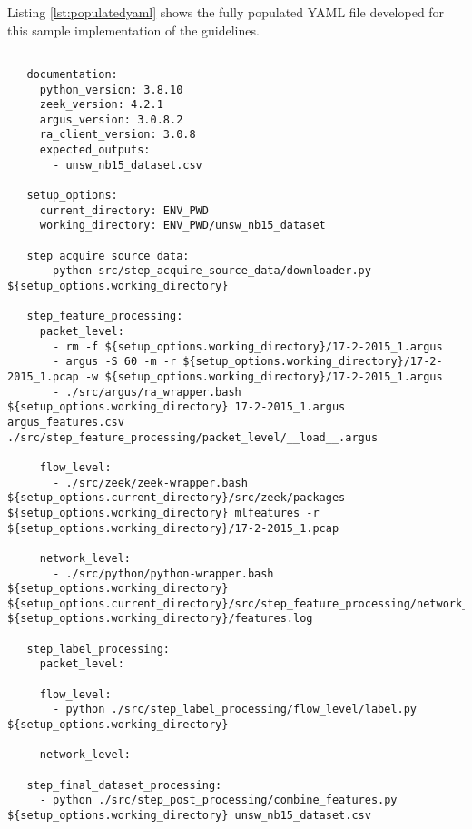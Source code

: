 \documentclass[conference]{IEEEtran}
\begin{document}
Listing \ref{lst:populatedyaml} shows the fully populated YAML file developed for this sample implementation of the guidelines.

\begin{lstlisting}[float=*, label=lst:populatedyaml, caption={
    The fully populated YAML file used as input for our sample implementation.
    Making the scripting calls available for inspection leaves no ambiguity regarding how a final dataset is generated from the original source data.
    }, captionpos=b, basicstyle=\tiny, backgroundcolor=\color{gray!10!white}, frame=stb, breaklines=True]

   documentation:
     python_version: 3.8.10
     zeek_version: 4.2.1
     argus_version: 3.0.8.2
     ra_client_version: 3.0.8 
     expected_outputs: 
       - unsw_nb15_dataset.csv
   
   setup_options:
     current_directory: ENV_PWD
     working_directory: ENV_PWD/unsw_nb15_dataset
   
   step_acquire_source_data:
     - python src/step_acquire_source_data/downloader.py ${setup_options.working_directory}
   
   step_feature_processing:
     packet_level:
       - rm -f ${setup_options.working_directory}/17-2-2015_1.argus
       - argus -S 60 -m -r ${setup_options.working_directory}/17-2-2015_1.pcap -w ${setup_options.working_directory}/17-2-2015_1.argus
       - ./src/argus/ra_wrapper.bash ${setup_options.working_directory} 17-2-2015_1.argus argus_features.csv ./src/step_feature_processing/packet_level/__load__.argus
   
     flow_level:
       - ./src/zeek/zeek-wrapper.bash ${setup_options.current_directory}/src/zeek/packages ${setup_options.working_directory} mlfeatures -r ${setup_options.working_directory}/17-2-2015_1.pcap
   
     network_level:
       - ./src/python/python-wrapper.bash ${setup_options.working_directory} ${setup_options.current_directory}/src/step_feature_processing/network_level ${setup_options.working_directory}/features.log
   
   step_label_processing:
     packet_level:
   
     flow_level:
       - python ./src/step_label_processing/flow_level/label.py ${setup_options.working_directory}
   
     network_level:
   
   step_final_dataset_processing:
     - python ./src/step_post_processing/combine_features.py ${setup_options.working_directory} unsw_nb15_dataset.csv
\end{lstlisting}
\end{document}
